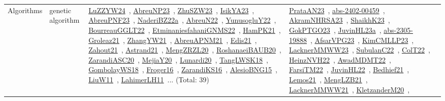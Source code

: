 {\begin{longtable}{lp{3cm}>{\raggedright\arraybackslash}p{6cm}>{\raggedright\arraybackslash}p{6cm}>{\raggedright\arraybackslash}p{8cm}}
Algorithms & genetic algorithm & \href{../works/LuZZYW24.pdf}{LuZZYW24}~\cite{LuZZYW24}, \href{../works/AbreuNP23.pdf}{AbreuNP23}~\cite{AbreuNP23}, \href{../works/ZhuSZW23.pdf}{ZhuSZW23}~\cite{ZhuSZW23}, \href{../works/IsikYA23.pdf}{IsikYA23}~\cite{IsikYA23}, \href{../works/AbreuPNF23.pdf}{AbreuPNF23}~\cite{AbreuPNF23}, \href{../works/NaderiBZ22a.pdf}{NaderiBZ22a}~\cite{NaderiBZ22a}, \href{../works/AbreuN22.pdf}{AbreuN22}~\cite{AbreuN22}, \href{../works/YunusogluY22.pdf}{YunusogluY22}~\cite{YunusogluY22}, \href{../works/BourreauGGLT22.pdf}{BourreauGGLT22}~\cite{BourreauGGLT22}, \href{../works/EtminaniesfahaniGNMS22.pdf}{EtminaniesfahaniGNMS22}~\cite{EtminaniesfahaniGNMS22}, \href{../works/HamPK21.pdf}{HamPK21}~\cite{HamPK21}, \href{../works/Groleaz21.pdf}{Groleaz21}~\cite{Groleaz21}, \href{../works/ZhangYW21.pdf}{ZhangYW21}~\cite{ZhangYW21}, \href{../works/AbreuAPNM21.pdf}{AbreuAPNM21}~\cite{AbreuAPNM21}, \href{../works/Edis21.pdf}{Edis21}~\cite{Edis21}, \href{../works/Zahout21.pdf}{Zahout21}~\cite{Zahout21}, \href{../works/Astrand21.pdf}{Astrand21}~\cite{Astrand21}, \href{../works/MengZRZL20.pdf}{MengZRZL20}~\cite{MengZRZL20}, \href{../works/RoshanaeiBAUB20.pdf}{RoshanaeiBAUB20}~\cite{RoshanaeiBAUB20}, \href{../works/ZarandiASC20.pdf}{ZarandiASC20}~\cite{ZarandiASC20}, \href{../works/MejiaY20.pdf}{MejiaY20}~\cite{MejiaY20}, \href{../works/Lunardi20.pdf}{Lunardi20}~\cite{Lunardi20}, \href{../works/TangLWSK18.pdf}{TangLWSK18}~\cite{TangLWSK18}, \href{../works/GombolayWS18.pdf}{GombolayWS18}~\cite{GombolayWS18}, \href{../works/Froger16.pdf}{Froger16}~\cite{Froger16}, \href{../works/ZarandiKS16.pdf}{ZarandiKS16}~\cite{ZarandiKS16}, \href{../works/AlesioBNG15.pdf}{AlesioBNG15}~\cite{AlesioBNG15}, \href{../works/LiuW11.pdf}{LiuW11}~\cite{LiuW11}, \href{../works/LahimerLH11.pdf}{LahimerLH11}~\cite{LahimerLH11}... (Total: 39) & \href{../works/PrataAN23.pdf}{PrataAN23}~\cite{PrataAN23}, \href{../works/abs-2402-00459.pdf}{abs-2402-00459}~\cite{abs-2402-00459}, \href{../works/AkramNHRSA23.pdf}{AkramNHRSA23}~\cite{AkramNHRSA23}, \href{../works/ShaikhK23.pdf}{ShaikhK23}~\cite{ShaikhK23}, \href{../works/GokPTGO23.pdf}{GokPTGO23}~\cite{GokPTGO23}, \href{../works/JuvinHL23a.pdf}{JuvinHL23a}~\cite{JuvinHL23a}, \href{../works/abs-2305-19888.pdf}{abs-2305-19888}~\cite{abs-2305-19888}, \href{../works/AfsarVPG23.pdf}{AfsarVPG23}~\cite{AfsarVPG23}, \href{../works/KimCMLLP23.pdf}{KimCMLLP23}~\cite{KimCMLLP23}, \href{../works/LacknerMMWW23.pdf}{LacknerMMWW23}~\cite{LacknerMMWW23}, \href{../works/SubulanC22.pdf}{SubulanC22}~\cite{SubulanC22}, \href{../works/ColT22.pdf}{ColT22}~\cite{ColT22}, \href{../works/HeinzNVH22.pdf}{HeinzNVH22}~\cite{HeinzNVH22}, \href{../works/AwadMDMT22.pdf}{AwadMDMT22}~\cite{AwadMDMT22}, \href{../works/FarsiTM22.pdf}{FarsiTM22}~\cite{FarsiTM22}, \href{../works/JuvinHL22.pdf}{JuvinHL22}~\cite{JuvinHL22}, \href{../works/Bedhief21.pdf}{Bedhief21}~\cite{Bedhief21}, \href{../works/Lemos21.pdf}{Lemos21}~\cite{Lemos21}, \href{../works/MengLZB21.pdf}{MengLZB21}~\cite{MengLZB21}, \href{../works/LacknerMMWW21.pdf}{LacknerMMWW21}~\cite{LacknerMMWW21}, \href{../works/KletzanderM20.pdf}{KletzanderM20}~\cite{KletzanderM20}, 
\end{longtable}}
